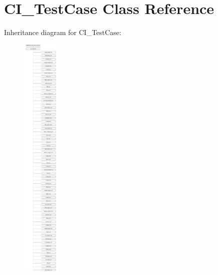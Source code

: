 \hypertarget{class_c_i___test_case}{}\section{C\+I\+\_\+\+Test\+Case Class Reference}
\label{class_c_i___test_case}
Inheritance diagram for C\+I\+\_\+\+Test\+Case\+:\begin{figure}[H]
\begin{center}
\leavevmode
\includegraphics[height=12.000000cm]{class_c_i___test_case}
\end{center}
\end{figure}
